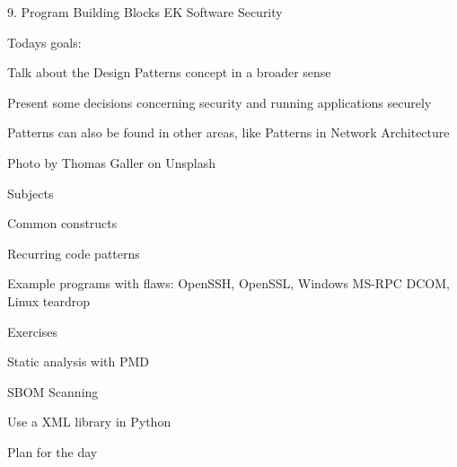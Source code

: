 \documentclass[Screen16to9,17pt]{foils}
\begin{document}
\mytitlepage
{9. Program Building Blocks}
{EK  Software Security}




Todays goals:
\begin{list2}
\item Talk about the Design Patterns concept in a broader sense
\item Present some decisions concerning security and running applications securely
\item Patterns can also be found in other areas, like Patterns in Network Architecture
\end{list2}

  Photo by Thomas Galler on Unsplash


\begin{list1}
\item Subjects
\begin{list2}
\item Common constructs
\item Recurring code patterns
\item Example programs with flaws: OpenSSH, OpenSSL, Windows MS-RPC DCOM, Linux teardrop
\end{list2}
\item Exercises
\begin{list2}
\item Static analysis with PMD
\item SBOM Scanning
\item Use a XML library in Python
\end{list2}
\end{list1}



Plan for the day
\end{document}
